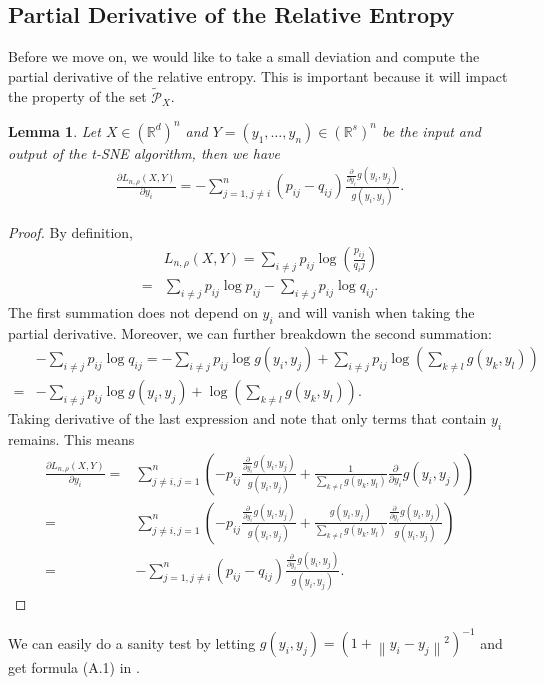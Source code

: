 \documentclass[10pt]{article}
\newcommand{\norm}[1]{\left\lVert#1\right\rVert}
\newtheorem{lemma}{\bf Lemma}
\newenvironment{Proof of lemma}{\noindent{\bf Proof of Lemma}}{\hfill$\Box$\newline}
\newenvironment{Proof of claim}{\noindent{\bf Proof of claim}}{\hfill$\Box$\newline}
\newenvironment{Proof of theorem}{\noindent{\bf Proof of Theorem}}{\hfill\scriptsize{$\Box$}\newline}
\newenvironment{Proof of theorems}{\noindent{\bf Proof of Theorems}}{\hfill$\Box$\newline}
\newenvironment{Proof of proposition}{\noindent{\bf Proof of Proposition}}{\hfill$\Box$\newline}
\newenvironment{Proof of propositions}{\noindent{\bf Proof of Propositions}}{\hfill$\Box$\newline}
\newenvironment{Proof of exercise}{\noindent{\it Proof of Exercise:}}{\hfill$\Box$}
\numberwithin{equation}{section}
\begin{document}
\subsection*{Partial Derivative of the Relative Entropy}
Before we move on, we would like to take a small deviation and compute the
partial derivative of the relative entropy. This is important because it will
impact the property of the set $\tilde{\mathcal{P}}_X$.
\begin{lemma} \label{derivative_lemma}
    Let $X \in (\mathbb{R}^d)^n$ and $Y = (y_1,\dots,y_n)\in (\mathbb{R}^s)^n$ be the input and output of the t-SNE algorithm, then we have
    \begin{align}
        \frac{\partial L_{n, \rho}(X,Y)}{\partial y_i} = -\sum_{j=1, j \neq i}^n (p_{ij}-q_{ij}) \frac{\frac{\partial}{\partial y_i}g(y_i,y_j)}{g(y_i,y_j)}.
    \end{align}
\end{lemma}
\begin{proof}
    By definition,
    \begin{align}
          & L_{n, \rho}(X,Y) = \sum_{i \neq j} p_{ij} \log \left(\frac{p_{ij}}{q_ij}\right) \nonumber \\
        = & \sum_{i \neq j} p_{ij} \log p_{ij} - \sum_{i \neq j} p_{ij} \log q_{ij}.
    \end{align}
    The first summation does not depend on $y_i$ and will vanish when taking the partial derivative. Moreover, we can further breakdown the second summation:
    \begin{align}
          & - \sum_{i \neq j} p_{ij} \log q_{ij} = - \sum_{i \neq j} p_{ij} \log g(y_i,y_j) + \sum_{i \neq j} p_{ij} \log \left(\sum_{k \neq l} g(y_k,y_l) \right)\nonumber \\
        = & - \sum_{i \neq j} p_{ij} \log g(y_i,y_j) + \log \left(\sum_{k \neq l} g(y_k,y_l)\right).
    \end{align}
    Taking derivative of the last expression and note that only terms that contain $y_i$ remains. This means
    \begin{align} \label{L_derivative}
        \frac{\partial L_{n, \rho}(X,Y)}{\partial y_i} = & \sum_{j \neq i, j = 1}^n \left(-p_{ij}\frac{\frac{\partial}{\partial y_i}g(y_i,y_j)}{g(y_i,y_j)} + \frac{1}{\sum_{k \neq l} g(y_k,y_l)} \frac{\partial}{\partial y_i} g(y_i,y_j)\right) \nonumber                            \\
        =                                                & \sum_{j \neq i, j = 1}^n \left(-p_{ij}\frac{\frac{\partial}{\partial y_i}g(y_i,y_j)}{g(y_i,y_j)} + \frac{g(y_i,y_j)}{\sum_{k \neq l} g(y_k,y_l)} \frac{\frac{\partial}{\partial y_i}g(y_i,y_j)}{g(y_i,y_j)}\right) \nonumber \\
        =                                                & -\sum_{j=1, j \neq i}^n (p_{ij}-q_{ij}) \frac{\frac{\partial}{\partial y_i}g(y_i,y_j)}{g(y_i,y_j)}.
    \end{align}
\end{proof}
We can easily do a sanity test by letting $g(y_i,y_j) = (1+\norm{y_i-y_j}^2)^{-1}$ and get formula (A.1) in \cite{auffinger-tsne}.
\end{document}
